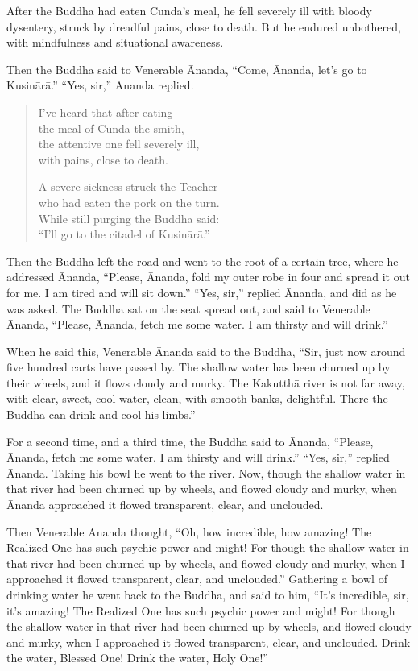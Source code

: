 \documentclass[12pt,openany]{book}%
\begin{document}
After the Buddha had eaten Cunda’s meal, he fell severely ill with bloody dysentery, struck by dreadful pains, close to death. But he endured unbothered, with mindfulness and situational awareness. 

Then the Buddha said to Venerable Ānanda, “Come, Ānanda, let’s go to \textsanskrit{Kusinārā}.” “Yes, sir,” Ānanda replied. 

\begin{verse}%
I’ve heard that after eating \\
the meal of Cunda the smith, \\
the attentive one fell severely ill, \\
with pains, close to death. 

A severe sickness struck the Teacher \\
who had eaten the pork on the turn. \\
While still purging the Buddha said: \\
“I’ll go to the citadel of \textsanskrit{Kusinārā}.” 

%
\end{verse}

Then the Buddha left the road and went to the root of a certain tree, where he addressed Ānanda, “Please, Ānanda, fold my outer robe in four and spread it out for me. I am tired and will sit down.” “Yes, sir,” replied Ānanda, and did as he was asked. The Buddha sat on the seat spread out, and said to Venerable Ānanda, “Please, Ānanda, fetch me some water. I am thirsty and will drink.” 

When he said this, Venerable Ānanda said to the Buddha, “Sir, just now around five hundred carts have passed by. The shallow water has been churned up by their wheels, and it flows cloudy and murky. The \textsanskrit{Kakutthā} river is not far away, with clear, sweet, cool water, clean, with smooth banks, delightful. There the Buddha can drink and cool his limbs.” 

For a second time, and a third time, the Buddha said to Ānanda, “Please, Ānanda, fetch me some water. I am thirsty and will drink.” “Yes, sir,” replied Ānanda. Taking his bowl he went to the river. Now, though the shallow water in that river had been churned up by wheels, and flowed cloudy and murky, when Ānanda approached it flowed transparent, clear, and unclouded. 

Then Venerable Ānanda thought, “Oh, how incredible, how amazing! The Realized One has such psychic power and might! For though the shallow water in that river had been churned up by wheels, and flowed cloudy and murky, when I approached it flowed transparent, clear, and unclouded.” Gathering a bowl of drinking water he went back to the Buddha, and said to him, “It’s incredible, sir, it’s amazing! The Realized One has such psychic power and might! For though the shallow water in that river had been churned up by wheels, and flowed cloudy and murky, when I approached it flowed transparent, clear, and unclouded. Drink the water, Blessed One! Drink the water, Holy One!” 
\end{document}
